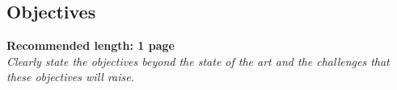 %	


\subsection*{Objectives}
\textbf{Recommended length: 1 page}\\

\textit{Clearly state the objectives beyond the state of the art and the challenges that these objectives will raise.}


